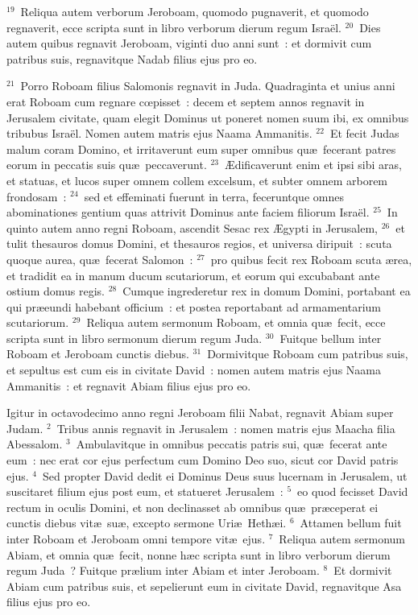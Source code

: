 ${}^{19}$~Reliqua autem verborum Jeroboam, quomodo pugnaverit, et quomodo regnaverit, ecce scripta sunt in libro verborum dierum regum Isra\"el.
${}^{20}$~Dies autem quibus regnavit Jeroboam, viginti duo anni sunt~: et dormivit cum patribus suis, regnavitque Nadab filius ejus pro eo.


${}^{21}$~Porro Roboam filius Salomonis regnavit in Juda. Quadraginta et unius anni erat Roboam cum regnare cœpisset~: decem et septem annos regnavit in Jerusalem civitate, quam elegit Dominus ut poneret nomen suum ibi, ex omnibus tribubus Isra\"el. Nomen autem matris ejus Naama Ammanitis.
${}^{22}$~Et fecit Judas malum coram Domino, et irritaverunt eum super omnibus qu\ae\ fecerant patres eorum in peccatis suis qu\ae\ peccaverunt.
${}^{23}$~\AE dificaverunt enim et ipsi sibi aras, et statuas, et lucos super omnem collem excelsum, et subter omnem arborem frondosam~:
${}^{24}$~sed et effeminati fuerunt in terra, feceruntque omnes abominationes gentium quas attrivit Dominus ante faciem filiorum Isra\"el.
${}^{25}$~In quinto autem anno regni Roboam, ascendit Sesac rex \AE gypti in Jerusalem,
${}^{26}$~et tulit thesauros domus Domini, et thesauros regios, et universa diripuit~: scuta quoque aurea, qu\ae\ fecerat Salomon~:
${}^{27}$~pro quibus fecit rex Roboam scuta \ae rea, et tradidit ea in manum ducum scutariorum, et eorum qui excubabant ante ostium domus regis.
${}^{28}$~Cumque ingrederetur rex in domum Domini, portabant ea qui pr\ae eundi habebant officium~: et postea reportabant ad armamentarium scutariorum.
${}^{29}$~Reliqua autem sermonum Roboam, et omnia qu\ae\ fecit, ecce scripta sunt in libro sermonum dierum regum Juda.
${}^{30}$~Fuitque bellum inter Roboam et Jeroboam cunctis diebus.
${}^{31}$~Dormivitque Roboam cum patribus suis, et sepultus est cum eis in civitate David~: nomen autem matris ejus Naama Ammanitis~: et regnavit Abiam filius ejus pro eo.

\lettrine[lines=10,image=true,loversize=0.05,lraise=-0.03]{I}{}gitur in octavodecimo anno regni Jeroboam filii Nabat, regnavit Abiam super Judam.
${}^{2}$~Tribus annis regnavit in Jerusalem~: nomen matris ejus Maacha filia Abessalom.
${}^{3}$~Ambulavitque in omnibus peccatis patris sui, qu\ae\ fecerat ante eum~: nec erat cor ejus perfectum cum Domino Deo suo, sicut cor David patris ejus.
${}^{4}$~Sed propter David dedit ei Dominus Deus suus lucernam in Jerusalem, ut suscitaret filium ejus post eum, et statueret Jerusalem~:
${}^{5}$~eo quod fecisset David rectum in oculis Domini, et non declinasset ab omnibus qu\ae\ pr\ae ceperat ei cunctis diebus vit\ae\ su\ae , excepto sermone Uri\ae\ Heth\ae i.
${}^{6}$~Attamen bellum fuit inter Roboam et Jeroboam omni tempore vit\ae\ ejus.
${}^{7}$~Reliqua autem sermonum Abiam, et omnia qu\ae\ fecit, nonne h\ae c scripta sunt in libro verborum dierum regum Juda~? Fuitque pr\ae lium inter Abiam et inter Jeroboam.
${}^{8}$~Et dormivit Abiam cum patribus suis, et sepelierunt eum in civitate David, regnavitque Asa filius ejus pro eo.


